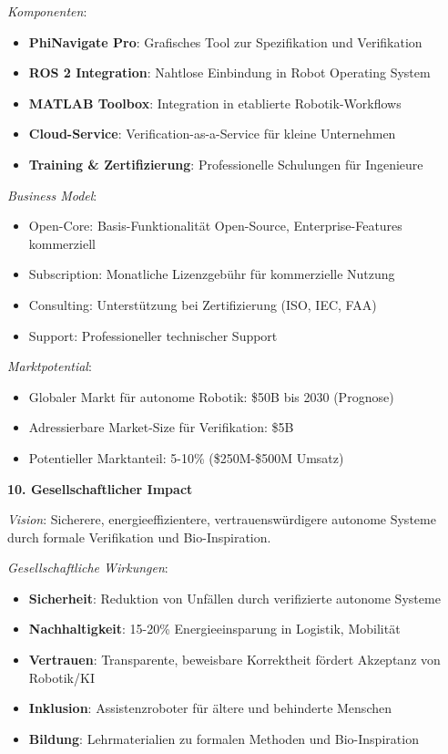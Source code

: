 ﻿\documentclass[a4paper,12pt]{article}
\theoremstyle{definition}
\begin{document}
\textit{Komponenten}:
\begin{itemize}
	\item \textbf{PhiNavigate Pro}: Grafisches Tool zur Spezifikation und Verifikation
	\item \textbf{ROS 2 Integration}: Nahtlose Einbindung in Robot Operating System
	\item \textbf{MATLAB Toolbox}: Integration in etablierte Robotik-Workflows
	\item \textbf{Cloud-Service}: Verification-as-a-Service für kleine Unternehmen
	\item \textbf{Training \& Zertifizierung}: Professionelle Schulungen für Ingenieure
\end{itemize}

\textit{Business Model}:
\begin{itemize}
	\item Open-Core: Basis-Funktionalität Open-Source, Enterprise-Features kommerziell
	\item Subscription: Monatliche Lizenzgebühr für kommerzielle Nutzung
	\item Consulting: Unterstützung bei Zertifizierung (ISO, IEC, FAA)
	\item Support: Professioneller technischer Support
\end{itemize}

\textit{Marktpotential}:
\begin{itemize}
	\item Globaler Markt für autonome Robotik: \$50B bis 2030 (Prognose)
	\item Adressierbare Market-Size für Verifikation: \$5B
	\item Potentieller Marktanteil: 5-10\% (\$250M-\$500M Umsatz)
\end{itemize}

\textbf{10. Gesellschaftlicher Impact}

\textit{Vision}: Sicherere, energieeffizientere, vertrauenswürdigere autonome Systeme durch formale Verifikation und Bio-Inspiration.

\textit{Gesellschaftliche Wirkungen}:
\begin{itemize}
	\item \textbf{Sicherheit}: Reduktion von Unfällen durch verifizierte autonome Systeme
	\item \textbf{Nachhaltigkeit}: 15-20\% Energieeinsparung in Logistik, Mobilität
	\item \textbf{Vertrauen}: Transparente, beweisbare Korrektheit fördert Akzeptanz von Robotik/KI
	\item \textbf{Inklusion}: Assistenzroboter für ältere und behinderte Menschen
	\item \textbf{Bildung}: Lehrmaterialien zu formalen Methoden und Bio-Inspiration
\end{itemize}
\end{document}
